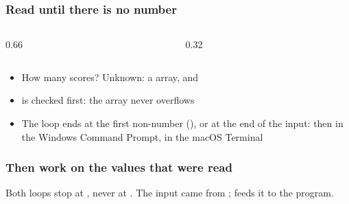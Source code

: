 \documentclass[aspectratio=169,10pt,compress]{beamer}
\begin{document}




\begin{frame}[t,fragile] \frametitle{Read until there is no number}
	\begin{columns}[T]
		\begin{column}{0.66\textwidth}
		\end{column}
		\begin{column}{0.32\textwidth}
		\end{column}
	\end{columns}

	\begin{itemize}\small
		\item How many scores? Unknown: a  array,  and 
		\item {} is checked first: the array never overflows
		\item The loop ends at the first non-number (), or at the end of the input:
		       then  in the Windows Command Prompt,  in the macOS Terminal
	\end{itemize}
\end{frame}




\begin{frame}[t,fragile] \frametitle{Then work on the values that were read}

	\footnotesize Both loops stop at , never at .
	The input came from ;  feeds it to the program.
\end{frame}




\end{document}
